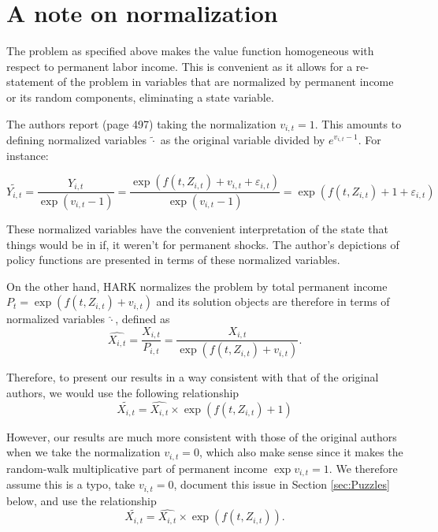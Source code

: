 \documentclass[./CGMPort.tex]{subfiles}
\begin{document}


\hypertarget{Normalization}{}
\section{A note on normalization}

The problem as specified above makes the value function homogeneous with respect to permanent labor income. This is convenient as it allows for a re-statement of the problem in variables that are normalized by permanent income or its random components, eliminating a state variable.

The authors report (page 497) taking the normalization $v_{i,t} = 1$. This amounts to defining normalized variables $\tilde{\cdot}$ as the original variable divided by $e^{v_{i,t}-1}$. For instance:

\begin{equation}
\tilde{Y_{i,t}} = \frac{Y_{i,t}}{\exp(v_{i,t}-1)} = \frac{\exp (f(t,Z_{i,t}) + v_{i,t} + \varepsilon_{i,t})}{\exp(v_{i,t}-1)} = \exp( f(t,Z_{i,t}) + 1 + \varepsilon_{i,t} )
\end{equation}

These normalized variables have the convenient interpretation of the state that things would be in if, it weren't for permanent shocks. The author's depictions of policy functions are presented in terms of these normalized variables.

On the other hand, HARK normalizes the problem by total permanent income $P_t = \exp (f(t,Z_{i,t}) + v_{i,t})$ and its solution objects are therefore in terms of normalized variables $\hat{\cdot}$, defined as
\begin{equation}
\hat{X_{i,t}} = \frac{X_{i,t}}{P_{i,t}} = \frac{X_{i,t}}{\exp (f(t,Z_{i,t}) + v_{i,t})}.
\end{equation}

Therefore, to present our results in a way consistent with that of the original authors, we would use the following relationship
\begin{equation}
\tilde{X_{i,t}} = \hat{X_{i,t}} \times \exp (f(t,Z_{i,t})+1)
\end{equation}

However, our results are much more consistent with those of the original authors when we take the normalization $v_{i,t} = 0$, which also make sense since it makes the random-walk multiplicative part of permanent income $\exp{v_{i,t}}=1$. We therefore assume this is a typo, take $v_{i,t} = 0$, document this issue in Section \ref{sec:Puzzles} below, and use the relationship
\begin{equation}
\tilde{X_{i,t}} = \hat{X_{i,t}} \times \exp (f(t,Z_{i,t})).
\end{equation}
\end{document}
